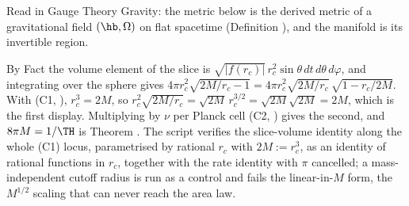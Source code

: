 Read in Gauge Theory Gravity: the metric below is the derived metric of a gravitational field $(\hb, \Omega)$ on flat spacetime (Definition ), and the manifold is its invertible region.

By Fact  the volume element of the slice is $\sqrt{|f(r_c)|}\,r_c^{2}\sin\theta\,dt\,d\theta\,d\varphi$, and integrating over the sphere gives $4\pi r_c^{2}\sqrt{2M/r_c - 1} = 4\pi r_c^{2}\sqrt{2M/r_c}\,\sqrt{1 - r_c/2M}$. With (C1, ), $r_c^{3} = 2M$, so $r_c^{2}\sqrt{2M/r_c} = \sqrt{2M}\,r_c^{3/2} = \sqrt{2M}\sqrt{2M} = 2M$, which is the first display. Multiplying by $\nu$ per Planck cell (C2, ) gives the second, and $8\pi M = 1/\TH$ is Theorem . The script verifies the slice-volume identity along the whole (C1) locus, parametrised by rational $r_c$ with $2M := r_c^{3}$, as an identity of rational functions in $r_c$, together with the rate identity with $\pi$ cancelled; a mass-independent cutoff radius is run as a control and fails the linear-in-$M$ form, the $M^{1/2}$ scaling that can never reach the area law.
